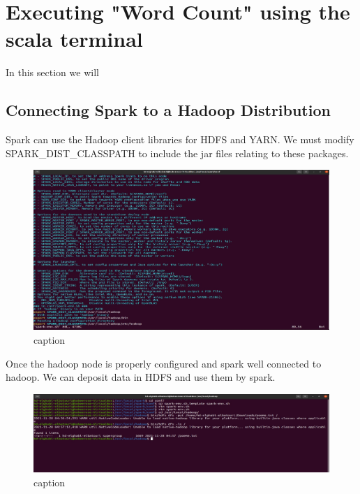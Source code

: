 \chapter{Executing "Word Count" using the scala terminal}
\par In this section we will 
\begin{spacing}{1.2}
\section{Connecting Spark to a Hadoop Distribution}

\par Spark can use the Hadoop client libraries for HDFS and YARN. We must modify SPARK_DIST_CLASSPATH to include the jar files relating to these packages.
\\
\begin{figure}[!htb] 
\begin{center} 
\includegraphics[width=1\linewidth]{Big_Data/Spark/Connecting Spark to Hadoop/spark-env config.jpg} 
\end{center} 
\caption{caption} 
\end{figure} 
\FloatBarrier



\par Once the hadoop node is properly configured and spark well connected to hadoop. We can deposit data
in HDFS and use them by spark.
\\
\begin{figure}[!htb] 
\begin{center} 
\includegraphics[width=1\linewidth]{Big_Data/Spark/Executing WCount using scala/Putting poeme.txt in hdfs.jpg} 
\end{center} 
\caption{caption} 
\end{figure} 
\FloatBarrier


\end{spacing}
